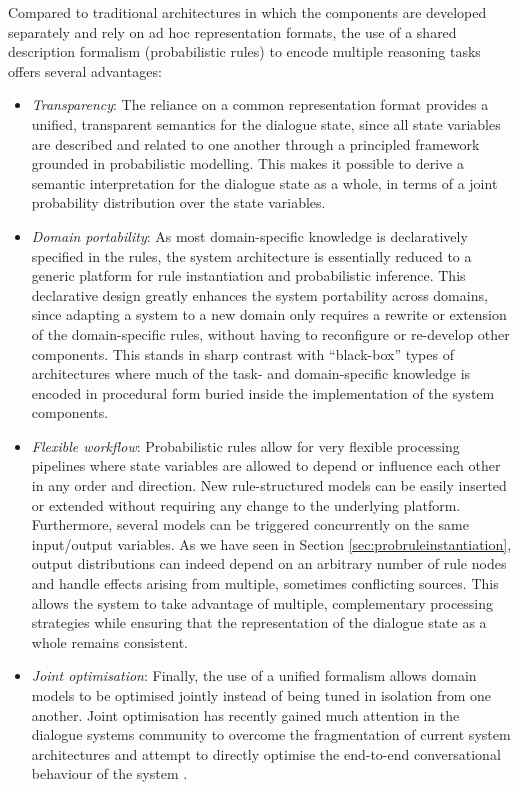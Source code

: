 Compared to traditional architectures in which the components are developed separately and rely on ad hoc representation formats, the use of a shared description formalism (probabilistic rules) to encode multiple reasoning tasks offers several advantages:
\begin{itemize}
\item \textit{Transparency}:  The reliance on a common representation format provides a unified, transparent semantics for the dialogue state, since all state variables are described and related to one another through a principled framework grounded in probabilistic modelling.  This makes it possible to derive a semantic interpretation for the dialogue state as a whole, in terms of a joint probability distribution over the state variables. 

\item \textit{Domain portability}:   As most domain-specific knowledge is declaratively specified in the rules, the system architecture is essentially reduced to a generic platform for rule instantiation and probabilistic inference.  This declarative design greatly enhances the system portability across domains, since adapting a system to a new domain only requires a rewrite or extension of the domain-specific rules, without having to reconfigure or re-develop other components.  This stands in sharp contrast with ``black-box'' types of architectures where much of the task- and domain-specific knowledge is encoded in procedural form buried inside the implementation of the system components.

\item \textit{Flexible workflow}:  Probabilistic rules allow for very flexible processing pipelines where state variables are allowed to depend or influence each other in any order and direction.  New rule-structured models can be easily inserted or extended without requiring any change to the underlying platform. Furthermore, several models can be triggered concurrently on the same input/output variables. As we have seen in Section \ref{sec:probruleinstantiation}, output distributions can indeed depend on an arbitrary number of rule nodes and handle effects arising from multiple, sometimes conflicting sources. This allows the system to take advantage of multiple, complementary processing strategies while ensuring that the representation of the dialogue state as a whole remains consistent. 

\item \textit{Joint optimisation}:  Finally, the use of a unified formalism allows domain models to be optimised jointly instead of being tuned in isolation from one another. Joint optimisation has recently gained much attention in the dialogue systems community to overcome the fragmentation of current system architectures and attempt to directly optimise the end-to-end conversational behaviour of the system \citep[see also][]{Lemon:2011}. 

\end{itemize}

